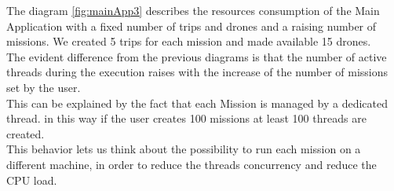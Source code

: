 The diagram \ref{fig:mainApp3} describes the resources consumption of the Main Application with a fixed number of trips and drones and a raising number of missions. We created 5 trips for each mission and made available 15 drones.
\\
The evident difference from the previous diagrams is that the number of active threads during the execution raises with the increase of the number of missions set by the user. 
\\
This can be explained by the fact that each Mission is managed by a dedicated thread.
in this way if the user creates 100 missions at least 100 threads are created.
\\
This behavior lets us think about the possibility to run each mission on a different machine, in order to reduce the threads concurrency and reduce the CPU load.
\\

